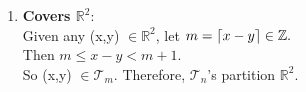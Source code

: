 \documentclass[10pt,landscape]{article}
\DeclarePairedDelimiter\ceil{\lceil}{\rceil}
\begin{document}
\begin{multicols}{3}
\begin{enumerate}
	\item
	\textbf{Covers $\mathbb{R}^{2}$}: \\
	Given any (x,y) $\in \mathbb{R}^{2}$, let 
	$m = 
	\ceil*{x-y} \in \mathbb{Z}.$ \\
	Then $m \leq x-y < m+1$. \\
	So (x,y) $\in \mathcal{T}_{m}$. Therefore, $\mathcal{T}_{n}$'s partition
	 $\mathbb{R}^{2}$.
	
	
	\end{enumerate}
	


	
\end{multicols}
\end{document}
